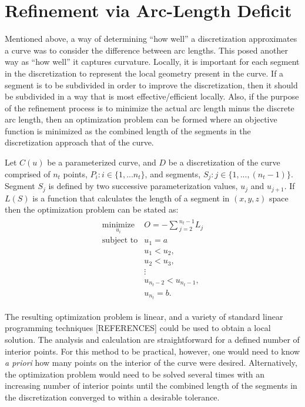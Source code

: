 \section{Refinement via Arc-Length Deficit}
Mentioned above, a way of determining ``how well'' a discretization approximates a curve was to consider the difference between arc lengths.  This posed another way as ``how well'' it captures curvature.  Locally, it is important for each segment in the discretization to represent the local geometry present in the curve.  If a segment is to be subdivided in order to improve the discretization, then it should be subdivided in a way that is most effective/efficient locally.  Also, if the purpose of the refinement process is to minimize the actual arc length minus the discrete arc length, then an optimization problem can be formed where an objective function is minimized as the combined length of the segments in the discretization approach that of the curve.

Let $C(u)$ be a parameterized curve, and $D$ be a discretization of the 
curve comprised of $n_t$ points, $P_i : i \in \{1,...n_t\}$, and segments, $S_j : j \in \{1,...,(n_t-1)\}$. Segment $S_j$ is defined by two successive parameterization values, $u_j$ and $u_{j+1}$. If $L(S)$ is a function that calculates the length of a segment  in $(x,y,z)$ space then the optimization problem can be stated as:
\begin{eqnarray*}
\begin{array}{cl}
\underset{u_i}{\text{minimize}} & O=-\sum{_{j=2}^{n_t-1}L_j} \\
\text{subject to} & u_1 = a \\
& u_1 < u_2, \\ 
& u_2 < u_3, \\
& \vdots \\
& u_{n_t-2} < u_{n_t-1},\\ 
& u_{n_t} = b.
\end{array}
\end{eqnarray*}

\noindent The resulting optimization problem is linear, and a 
variety of standard linear programming techniques [REFERENCES] could be 
used to obtain a local solution.  The analysis 
and calculation are straightforward for a defined number of interior 
points.  For this method to be practical, however, one would need to know 
{\it{a priori}} how many points on the interior of the curve were desired.  
Alternatively, the optimization problem would need to be solved 
several times with an increasing number of interior points until the 
combined length of the segments in the discretization converged to within 
a desirable tolerance.

